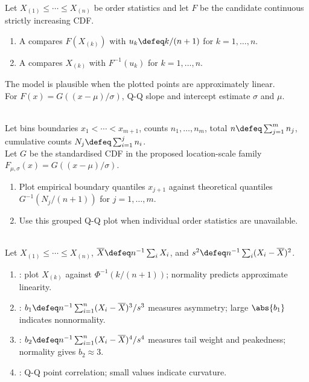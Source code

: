 \begin{method} \label{meth:probability-plot-construction} \\
Let $X_{(1)}\leq\cdots\leq X_{(n)}$ be order statistics and let $F$ be the candidate continuous strictly increasing CDF.
\begin{enumerate}[label=(\roman*)]
\setlength{\itemsep}{0pt}
\item A  compares $F(X_{(k)})$ with $u_k\defeq k/(n+1)$ for $k=1,\ldots,n$.
\item A  compares $X_{(k)}$ with $F^{-1}(u_k)$ for $k=1,\ldots,n$.
\end{enumerate}
The model is plausible when the plotted points are approximately linear.\\
For $F(x)=G((x-\mu)/\sigma)$, Q-Q slope and intercept estimate $\sigma$ and $\mu$.
\end{method}

\begin{method} \label{meth:probability-plots-for-grouped-data} \\
Let bins boundaries $x_1<\cdots<x_{m+1}$, counts $n_1,\ldots,n_m$, total $n\defeq\sum_{j=1}^mn_j$, cumulative counts $N_j\defeq\sum_{i=1}^jn_i$.\\
Let $G$ be the standardised CDF in the proposed location-scale family $F_{\mu,\sigma}(x)=G((x-\mu)/\sigma)$.
\begin{enumerate}[label=(\roman*)]
\setlength{\itemsep}{0pt}
\item Plot empirical boundary quantiles $x_{j+1}$ against theoretical quantiles $G^{-1}(N_j/(n+1))$ for $j=1,\ldots,m$.
\item Use this grouped Q-Q plot when individual order statistics are unavailable.
\end{enumerate}
\end{method}

\begin{definition} \label{def:normality-diagnostics} \\
Let $X_{(1)}\leq\cdots\leq X_{(n)}$, $\overline{X}\defeq n^{-1}\sum_iX_i$, and $s^2\defeq n^{-1}\sum_i(X_i-\overline{X})^2$.
\begin{enumerate}[label=(\roman*)]
\setlength{\itemsep}{0pt}
\item {}: plot $X_{(k)}$ against $\Phi^{-1}(k/(n+1))$; normality predicts approximate linearity.
\item {}: $b_1\defeq n^{-1}\sum_{i=1}^n(X_i-\overline{X})^3/s^3$ measures asymmetry; large $\abs{b_1}$ indicates nonnormality.
\item {}: $b_2\defeq n^{-1}\sum_{i=1}^n(X_i-\overline{X})^4/s^4$ measures tail weight and peakedness; normality gives $b_2\approx3$.
\item {}: Q-Q point correlation; small values indicate curvature.
\end{enumerate}
\end{definition}

